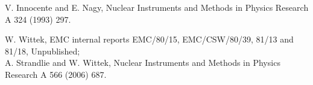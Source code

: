 
 V. Innocente and E. Nagy,
                        Nuclear Instruments and Methods in Physics Research A 324 (1993) 297.

 W. Wittek,
                      EMC internal reports EMC/80/15, EMC/CSW/80/39, 81/13 and 81/18,
                      Unpublished; \\
                      A. Strandlie and W. Wittek,
                      Nuclear Instruments and Methods in Physics Research A 566 (2006) 687.

